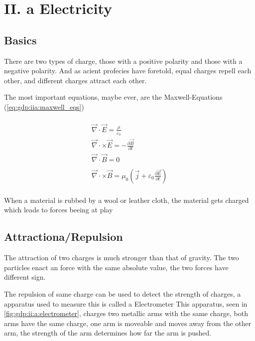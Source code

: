\section{II. a Electricity}

\subsection{Basics}

There are two types of charge,
    those with a positive polarity and
    those with a negative polarity.
And as acient profecies have foretold, equal charges repell each other,
    and different charges attract each other.

The most important equations, maybe ever, are the Maxwell-Equations 
    (\ref{eq:gdp:iia:maxwell_eqs})

\begin{multline} \label{eq:gdp:iia:maxwell_eqs}\\
\vec{\nabla}\cdot \vec{E} = \frac{\rho}{\varepsilon_0}\\
\vec{\nabla}\cdot \times \vec{E} = -\frac{\partial \vec{B}}{\partial t}\\
\vec{\nabla}\cdot \vec{B} = 0 \\
\\
\vec{\nabla}\cdot \times \vec{B} =
    \mu_0 \left( \vec{j} + \varepsilon_0 \frac{\partial \vec{E}}{\partial t} \right)\\
\end{multline}

When a material is rubbed by a wool or leather cloth,
    the material gets charged which leads to forces beeing at play

\subsection{Attractiona/Repulsion}

The attraction of two charges is much stronger than that of gravity.
The two particles enact an force with the same absolute value,
    the two forces have different sign.


The repulsion of same charge can be used to detect the strength of charges,
    a apparatus used to measure this is called a Electrometer
This apparatus, seen in \ref{fig:gdp:ii:a:electrometer}, charges two metallic arms with the same charge,
    both arms have the same charge,
    one arm is moveable and moves away from the other arm,
    the strength of the arm determines how far the arm is pushed.


